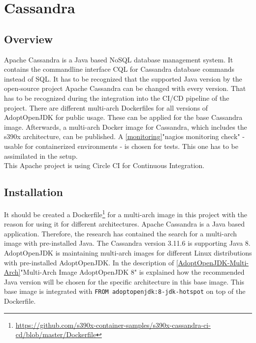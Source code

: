 \chapter{Cassandra}\label{ch:cassandra}

\section{Overview}

Apache Cassandra is a Java based NoSQL database management system. It contains the commandline interface CQL for Cassandra database commands instead of SQL. It has to be recognized that the supported Java version by the open-source project Apache Cassandra can be changed with every version. 
That has to be recognized during the integration into the CI/CD pipeline of the project. There are different multi-arch Dockerfiles for all versions of AdoptOpenJDK for public usage. These can be applied for the base Cassandra image. Afterwards, a multi-arch Docker image for Cassandra, which includes the s390x architecture, can be published. 
A \ref{monitoring}"nagios monitoring check" - usable for containerized environments - is chosen for tests. This one has to be assimilated in the setup. \\ 
This Apache project is using Circle CI for Continuous Integration. 

\section{Installation}\label{Cassandra-Installation}

It should be created a Dockerfile\footnote{\url{https://github.com/s390x-container-samples/s390x-cassandra-ci-cd/blob/master/Dockerfile}} for a multi-arch image in this project with the reason for using it for different architectures.
Apache Cassandra is a Java based application. Therefore, the research has contained the search for a multi-arch image with pre-installed Java. The Cassandra version 3.11.6 is supporting Java 8. 
AdoptOpenJDK is maintaining multi-arch images for different Linux distributions with pre-installed AdoptOpenJDK.
In the description of \ref{AdoptOpenJDK-Multi-Arch}"Multi-Arch Image AdoptOpenJDK 8" is explained how the recommended Java version will be chosen for the specific architecture in this base image. 
This base image is integrated with \lstinline!FROM adoptopenjdk:8-jdk-hotspot! on top of the Dockerfile.

